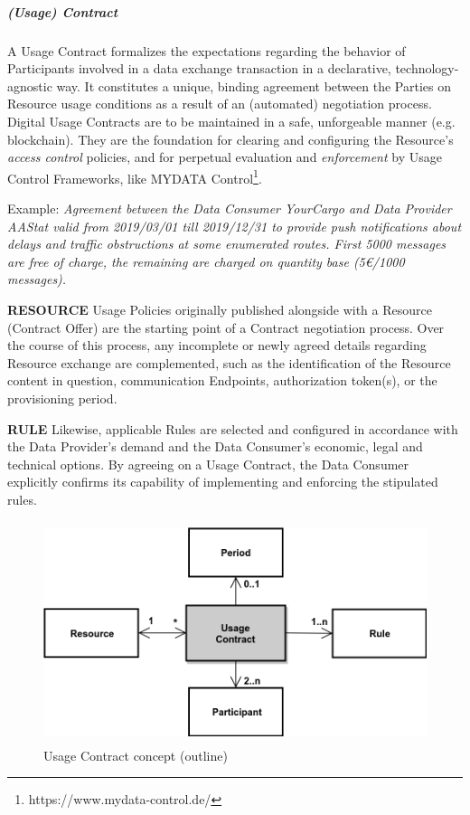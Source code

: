 
\subparagraph*{(Usage) Contract}
A Usage Contract formalizes the expectations regarding the behavior of Participants involved in a data exchange transaction in a declarative, technology-agnostic way. It constitutes a unique, binding agreement between the Parties on Resource usage conditions as a result of an (automated) negotiation process. Digital Usage Contracts are to be maintained in a safe, unforgeable manner (e.g. blockchain). They are the foundation for clearing and configuring the Resource’s \textit{access control} policies, and for perpetual evaluation and \textit{enforcement }by Usage Control Frameworks, like MYDATA Control\footnote{https://www.mydata-control.de/ }. 

Example: \textit{Agreement between the Data Consumer YourCargo and Data Provider AAStat valid from 2019/03/01 till 2019/12/31 to provide push notifications about delays and traffic obstructions at some enumerated routes. First 5000 messages are free of charge, the remaining are charged on quantity base (5€/1000 messages).}

\textbf{RESOURCE} Usage Policies originally published alongside with a Resource (Contract Offer) are the starting point of a Contract negotiation process. Over the course of this process, any incomplete or newly agreed details regarding Resource exchange are complemented, such as the identification of the Resource content in question, communication Endpoints, authorization token(s), or the provisioning period. 

\textbf{RULE} Likewise, applicable Rules are selected and configured in accordance with the Data Provider’s demand and the Data Consumer’s economic, legal and technical options. By agreeing on a Usage Contract, the Data Consumer explicitly confirms its capability of implementing and enforcing the stipulated rules.




\begin{figure}[H]
	\begin{Center}
		\includegraphics[width=4.67in,height=2.55in]{./media/image52.png}
		\caption{Usage Contract concept (outline)}
		\label{fig:Usage_Contract_concept_outline}
	\end{Center}
\end{figure}


